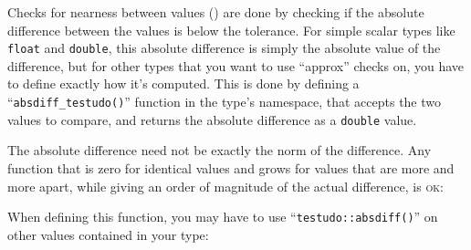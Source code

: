 \documentclass[twoside, a4paper, article]{memoir}
\newcommand\typesetexample[1]{%
  \typesetexamplesource{#1}
}
\providecommand\typesetexamplesource[1]{%
}
\begin{document}
Checks for nearness between values ()
are done by checking if the absolute difference between the values is below the
tolerance.  For simple scalar types like \texttt{float} and \texttt{double},
this absolute difference is simply the absolute value of the difference, but
for other types that you want to use ``approx'' checks on, you have to define
exactly how it's computed.  This is done by defining a
``\texttt{absdiff\_testudo()}'' function in the type's namespace, that accepts
the two values to compare, and returns the absolute difference as a
\texttt{double} value.

\typesetexample{testudo-support-my-vector-absdiff-testudo}

The absolute difference need not be exactly the norm of the difference.  Any
function that is zero for identical values and grows for values that are more
and more apart, while giving an order of magnitude of the actual difference, is
\textsc{ok}:

\typesetexample{testudo-support-my-vector-absdiff-testudo-manhattan}

When defining this function, you may have to use
``\texttt{testudo::absdiff()}'' on other values contained in your type:

\typesetexample{testudo-support-my-vector-absdiff-testudo-absdiff}





\end{document}
